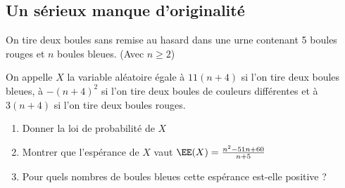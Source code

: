 \documentclass[oneside,12pt]{book}          %
\begin{document}
\subsection{Un sérieux manque d'originalité}
On tire deux boules sans remise au hasard dans une urne contenant 5 boules rouges et $n$ boules bleues. (Avec $n\geq2$)

On appelle $X$ la variable aléatoire égale à $11(n+4)$ si l'on tire deux boules bleues, à $-(n+4)^2$ si l'on tire deux boules de couleurs différentes et à $3(n+4)$ si l'on tire deux boules rouges.
\begin{enumerate}
    \item Donner la loi de probabilité de $X$
    \item Montrer que l'espérance de $X$ vaut $\EE(X) = \frac{n^2-51n+60}{n+5}$
    \item Pour quels nombres de boules bleues cette espérance est-elle positive ?
\end{enumerate}
\end{document}
